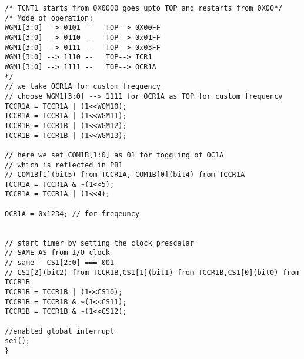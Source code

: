 \begin{verbatim}
/* TCNT1 starts from 0X0000 goes upto TOP and restarts from 0X00*/
/* Mode of operation:
WGM1[3:0] --> 0101 --	TOP--> 0X00FF
WGM1[3:0] --> 0110 --	TOP--> 0x01FF
WGM1[3:0] --> 0111 --	TOP--> 0x03FF
WGM1[3:0] --> 1110 --	TOP--> ICR1
WGM1[3:0] --> 1111 --	TOP--> OCR1A
*/	
// we take OCR1A for custom frequency 
// choose WGM1[3:0] --> 1111 for OCR1A as TOP for custom frequency
TCCR1A = TCCR1A | (1<<WGM10);
TCCR1A = TCCR1A | (1<<WGM11);
TCCR1B = TCCR1B | (1<<WGM12);
TCCR1B = TCCR1B | (1<<WGM13);	

// here we set COM1B[1:0] as 01 for toggling of OC1A
// which is reflected in PB1
// COM1B[1](bit5) from TCCR1A, COM1B[0](bit4) from TCCR1A
TCCR1A = TCCR1A & ~(1<<5);
TCCR1A = TCCR1A | (1<<4);

OCR1A = 0x1234; // for freqeuncy


// start timer by setting the clock prescalar
// SAME AS from I/O clock
// same-- CS1[2:0] === 001
// CS1[2](bit2) from TCCR1B,CS1[1](bit1) from TCCR1B,CS1[0](bit0) from TCCR1B
TCCR1B = TCCR1B | (1<<CS10);
TCCR1B = TCCR1B & ~(1<<CS11);
TCCR1B = TCCR1B & ~(1<<CS12);

//enabled global interrupt
sei();
}
\end{verbatim}


